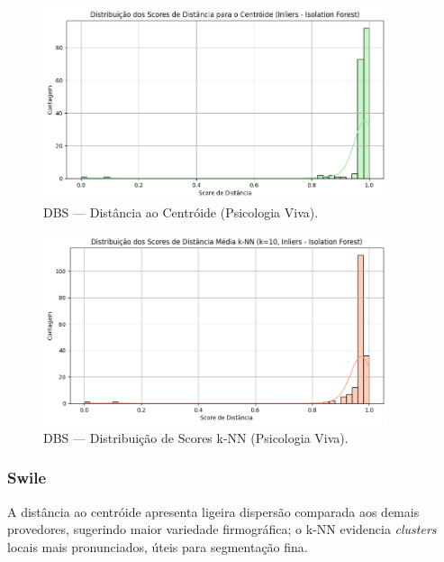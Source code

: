 \begin{figure}[H]
    \centering
    \includegraphics[width=0.9\textwidth]{imagens/psiviva_centroid.png}
    \caption{DBS — Distância ao Centróide (Psicologia Viva).}
    \label{fig:psiviva_centroid}
\end{figure}

\begin{figure}[H]
    \centering
    \includegraphics[width=0.9\textwidth]{imagens/psiviva_knn.png}
    \caption{DBS — Distribuição de Scores k-NN (Psicologia Viva).}
    \label{fig:psiviva_knn}
\end{figure}

\subsubsection*{Swile}
\noindent
A distância ao centróide apresenta ligeira dispersão comparada aos demais provedores, sugerindo maior variedade firmográfica; o k-NN evidencia \textit{clusters} locais mais pronunciados, úteis para segmentação fina.

